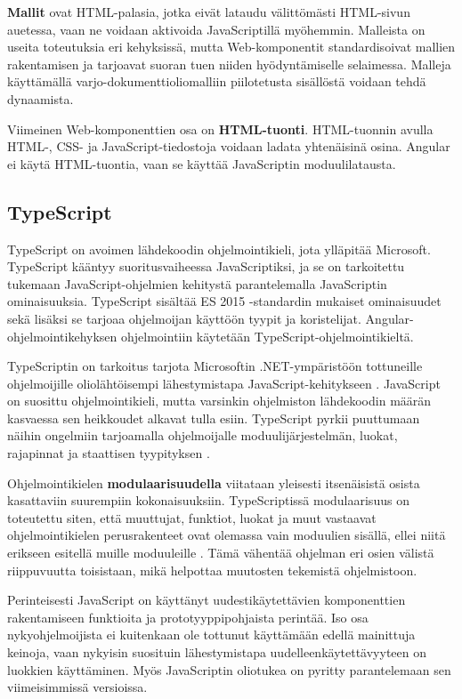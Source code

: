 \documentclass[utf8]{gradu3}
\begin{document}
\textbf{Mallit} ovat HTML-palasia, jotka eivät lataudu välittömästi HTML-sivun auetessa, vaan ne voidaan aktivoida JavaScriptillä myöhemmin. Malleista on useita toteutuksia eri kehyksissä, mutta Web-komponentit standardisoivat mallien rakentamisen ja tarjoavat suoran tuen niiden hyödyntämiselle selaimessa. Malleja käyttämällä varjo-dokumenttioliomalliin piilotetusta sisällöstä voidaan tehdä dynaamista. 

Viimeinen Web-komponenttien osa on \textbf{HTML-tuonti}. HTML-tuonnin avulla HTML-, CSS- ja JavaScript-tiedostoja voidaan ladata yhtenäisinä osina. Angular ei käytä HTML-tuontia, vaan se käyttää JavaScriptin moduulilatausta. \parencite[]{angular-6-by-example}

\subsection{TypeScript}

TypeScript on avoimen lähdekoodin ohjelmointikieli, jota ylläpitää Microsoft. TypeScript kääntyy suoritusvaiheessa JavaScriptiksi, ja se on tarkoitettu tukemaan JavaScript-ohjelmien kehitystä parantelemalla JavaScriptin ominaisuuksia. TypeScript sisältää ES 2015 -standardin mukaiset ominaisuudet sekä lisäksi se tarjoaa ohjelmoijan käyttöön tyypit ja koristelijat. Angular-ohjelmointikehyksen ohjelmointiin käytetään TypeScript-ohjelmointikieltä.

TypeScriptin on tarkoitus tarjota Microsoftin .NET-ympäristöön tottuneille ohjelmoijille oliolähtöisempi lähestymistapa JavaScript-kehitykseen \parencite[]{maharry-typescript}. JavaScript on suosittu ohjelmointikieli, mutta varsinkin ohjelmiston lähdekoodin määrän kasvaessa sen heikkoudet alkavat tulla esiin. TypeScript pyrkii puuttumaan näihin ongelmiin tarjoamalla ohjelmoijalle moduulijärjestelmän, luokat, rajapinnat ja staattisen tyypityksen \parencite[]{understanding-typescript}.

Ohjelmointikielen \textbf{modulaarisuudella} viitataan yleisesti itsenäisistä osista kasattaviin suurempiin kokonaisuuksiin. TypeScriptissä modulaarisuus on toteutettu siten, että muuttujat, funktiot, luokat ja muut vastaavat ohjelmointikielen perusrakenteet ovat olemassa vain moduulien sisällä, ellei niitä erikseen esitellä muille moduuleille \parencite[]{typescript-modules}. Tämä vähentää ohjelman eri osien välistä riippuvuutta toisistaan, mikä helpottaa muutosten tekemistä ohjelmistoon.

Perinteisesti JavaScript on käyttänyt uudestikäytettävien komponenttien rakentamiseen funktioita ja prototyyppipohjaista perintää. Iso osa nykyohjelmoijista ei kuitenkaan ole tottunut käyttämään edellä mainittuja keinoja, vaan nykyisin suosituin lähestymistapa uudelleenkäytettävyyteen on luokkien käyttäminen. Myös JavaScriptin oliotukea on pyritty parantelemaan sen viimeisimmissä versioissa. \parencite[]{typescript-classes}
\end{document}

